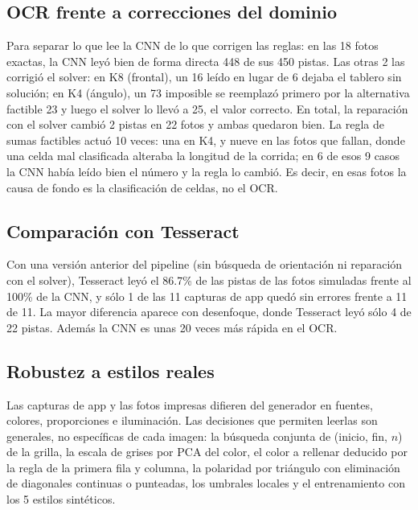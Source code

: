\documentclass[conference,a4paper]{IEEEtran}
\begin{document}
\subsection{OCR frente a correcciones del dominio}
Para separar lo que lee la CNN de lo que corrigen las reglas: en las 18 fotos exactas, la CNN leyó bien de forma directa 448 de sus
450 pistas. Las otras 2 las corrigió el solver: en K8 (frontal), un 16 leído en lugar de 6 dejaba el tablero sin solución; en K4 (ángulo),
un 73 imposible se reemplazó primero por la alternativa factible 23 y luego el solver lo llevó a 25, el valor correcto. En total, la
reparación con el solver cambió 2 pistas en 22 fotos y ambas quedaron bien. La regla de sumas factibles actuó 10 veces: una en K4, y
nueve en las fotos que fallan, donde una celda mal clasificada alteraba la longitud de la corrida; en 6 de esos 9 casos la CNN había
leído bien el número y la regla lo cambió. Es decir, en esas fotos la causa de fondo es la clasificación de celdas, no el OCR.

\subsection{Comparación con Tesseract}
Con una versión anterior del pipeline (sin búsqueda de orientación ni reparación con el solver), Tesseract leyó el 86.7\% de las
pistas de las fotos simuladas frente al 100\% de la CNN, y sólo 1 de las 11 capturas de app quedó sin errores frente a 11 de 11.
La mayor diferencia aparece con desenfoque, donde Tesseract leyó sólo 4 de 22 pistas. Además la CNN es unas 20 veces más rápida en el OCR.

\subsection{Robustez a estilos reales}
Las capturas de app y las fotos impresas difieren del generador en fuentes, colores, proporciones e iluminación. Las decisiones que
permiten leerlas son generales, no específicas de cada imagen: la búsqueda conjunta de (inicio, fin, $n$) de la grilla, la escala de
grises por PCA del color, el color a rellenar deducido por la regla de la primera fila y columna, la polaridad por triángulo con
eliminación de diagonales continuas o punteadas, los umbrales locales y el entrenamiento con los 5 estilos sintéticos.
\end{document}
